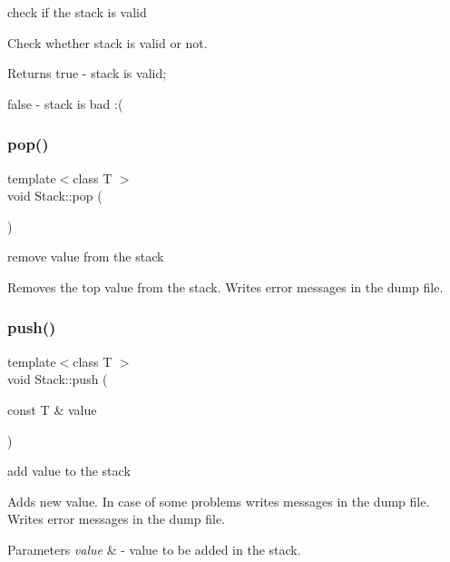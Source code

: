 check if the stack is valid 

Check whether stack is valid or not.

\begin{DoxyReturn}{Returns}
{\ttfamily true} -\/ stack is valid; 

{\ttfamily false} -\/ stack is bad \+:( 
\end{DoxyReturn}
\mbox{\label{class_my_namespace_1_1_stack_a09e820f3c3531cf3f401af3b3ca5d56f}} 
\subsubsection{\texorpdfstring{pop()}{pop()}}
{\footnotesize\ttfamily template$<$class T $>$ \\
void Stack\+::pop (\begin{DoxyParamCaption}{ }\end{DoxyParamCaption})}



remove value from the stack 

Removes the top value from the stack. Writes error messages in the dump file. \mbox{\label{class_my_namespace_1_1_stack_a7066fcb88effbe19f464f8f635efcbc5}} 
\subsubsection{\texorpdfstring{push()}{push()}}
{\footnotesize\ttfamily template$<$class T $>$ \\
void Stack\+::push (\begin{DoxyParamCaption}\item[{const T \&}]{value }\end{DoxyParamCaption})}



add value to the stack 

Adds new value. In case of some problems writes messages in the dump file. Writes error messages in the dump file.


\begin{DoxyParams}{Parameters}
{\em value} & -\/ value to be added in the stack. \\
\hline
\end{DoxyParams}
\mbox{\label{class_my_namespace_1_1_stack_a20e64b09239efa6340b33546115424b6}} 
